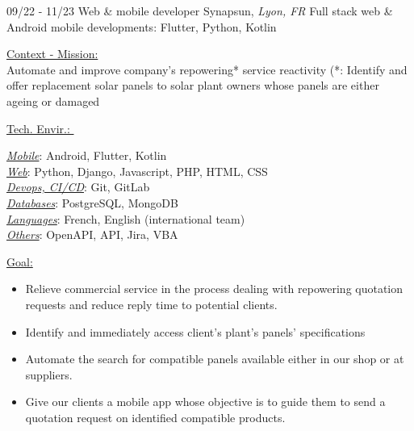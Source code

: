 \documentclass[]{friggeri-cv}
\begin{document}
\begin{entrylist}
  \entry
    {09/22 - 11/23}
    {Web \& mobile developer}
    {Synapsun, \textit{Lyon, FR}}
    {Full stack web \& Android mobile developments: \hspace*{8mm}Flutter, Python, Kotlin}
\end{entrylist}
\vspace{-10pt}
\begin{minipage}[t]{0.65\linewidth}
\underline{Context - Mission: }\\
Automate and improve company's repowering* service reactivity (*: Identify and offer replacement solar panels to solar plant owners whose panels are either ageing or damaged\\
\end{minipage} %
\begin{minipage}[t]{0.38\textwidth}
    \underline{Tech. Envir.: }\
    \vspace{1mm}
    
\underline{\textit{Mobile}}: Android, Flutter, Kotlin\\
\underline{\textit{Web}}: Python, Django, Javascript, PHP, HTML, CSS\\
\underline{\textit{Devops, CI/CD}}: Git, GitLab\\
\underline{\textit{Databases}}: PostgreSQL, MongoDB\\
\underline{\textit{Languages}}: French, English (international team)\\
\underline{\textit{Others}}: OpenAPI, API, Jira, VBA
    \end{minipage}
\vspace{1.5mm}
\underline{Goal: }\\

\begin{itemize}
\setlength{\itemsep}{1pt}
\setlength{\parskip}{0pt}
\setlength{\parsep}{0pt}

\item Relieve commercial service in the process dealing with repowering quotation requests and reduce reply time to potential clients.
\item Identify and immediately access client's plant's panels' specifications
\item Automate the search for compatible panels available either in our shop or at suppliers.
\item Give our clients a mobile app whose objective is to guide them to send a quotation request on identified compatible products.
\end{itemize}
\end{document}
